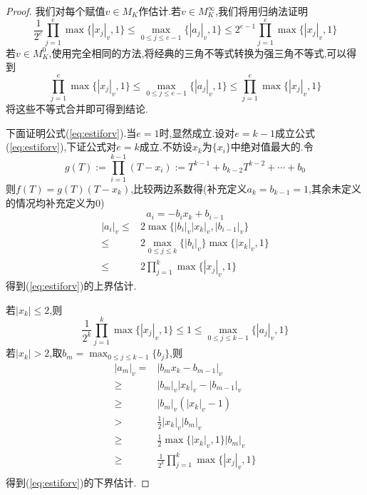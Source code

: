 \documentclass[12pt,A4paper,oneside,reqno]{amsart}
\numberwithin{equation}{section}
\theoremstyle{definition}
\theoremstyle{plain}
\theoremstyle{plain}
\numberwithin{equation}{section}
\theoremstyle{remark}
\begin{document}
\begin{proof}
	我们对每个赋值$v \in M_K$作估计.若$v \in M_K^{\infty}$,我们将用归纳法证明
	\begin{equation}\label{eq:estiforv}
		\frac{1}{2^e} \prod_{j=1}^{e}\max \{|x_j|_v,1\} \leqslant \max_{0 \leqslant j \leqslant e-1}\{|a_j|_v,1\} \leqslant 2^{e-1} \prod_{j=1}^{e}\max \{|x_j|_v,1\}
	\end{equation}
	若$v \in M_K^0$,使用完全相同的方法,将经典的三角不等式转换为强三角不等式,可以得到
	\begin{equation*}\label{eq:estiforv=0}
	\prod_{j=1}^{e}\max \{|x_j|_v,1\} \leqslant \max_{0 \leqslant j \leqslant e-1}\{|a_j|_v,1\} \leqslant \prod_{j=1}^{e}\max \{|x_j|_v,1\}
	\end{equation*}
	将这些不等式合并即可得到结论.
	
	下面证明公式(\ref{eq:estiforv}).当$e=1$时,显然成立.设对$e=k-1$成立公式(\ref{eq:estiforv}),下证公式对$e=k$成立.不妨设$x_k$为$\{x_i\}$中绝对值最大的.令
	$$g(T):=\prod_{i=1}^{k-1}(T-x_i):=T^{k-1}+b_{k-2}T^{k-2}+\cdots+b_0$$
	则$f(T)=g(T)(T-x_k)$,比较两边系数得(补充定义$a_k=b_{k-1}=1$,其余未定义的情况均补充定义为$0$)
	$$a_i=-b_ix_k+b_{i-1}$$
	\begin{equation*}
	\begin{aligned}
			|a_i|_v \leqslant& 2\max\{|b_i|_v|x_k|_v,|b_{i-1}|_v\}\\
			\leqslant& 2\max_{0 \leqslant j \leqslant k}\{|b_i|_v\}\max\{|x_k|_v,1\}\\
			\leqslant& 2\prod_{j=1}^{k}\max\{|x_j|_v,1\}
	\end{aligned}
	\end{equation*}
	得到(\ref{eq:estiforv})的上界估计.
	
	若$|x_k| \leqslant 2$,则
	$$\frac{1}{2^k} \prod_{j=1}^{k}\max \{|x_j|_v,1\} \leqslant 1 \leqslant \max_{0 \leqslant j \leqslant k-1}\{|a_j|_v,1\}$$
	若$|x_k|> 2$,取$b_m=\max_{0 \leqslant j \leqslant k-1}\{b_j\}$,则
	\begin{equation*}
	\begin{aligned}
	|a_m|_v=&|b_mx_k-b_{m-1}|_v\\
	\geqslant& |b_m|_v|x_k|_v-|b_{m-1}|_v\\
	\geqslant& |b_m|_v(|x_k|_v-1)\\
	>& \frac{1}{2}|x_k|_v|b_m|_v\\
	\geqslant& \frac{1}{2}\max\{|x_k|_v,1\}|b_m|_v\\
	\geqslant&\frac{1}{2^k} \prod_{j=1}^{k}\max \{|x_j|_v,1\}\\
	\end{aligned}
	\end{equation*}
	得到(\ref{eq:estiforv})的下界估计.
\end{proof}
\end{document}
